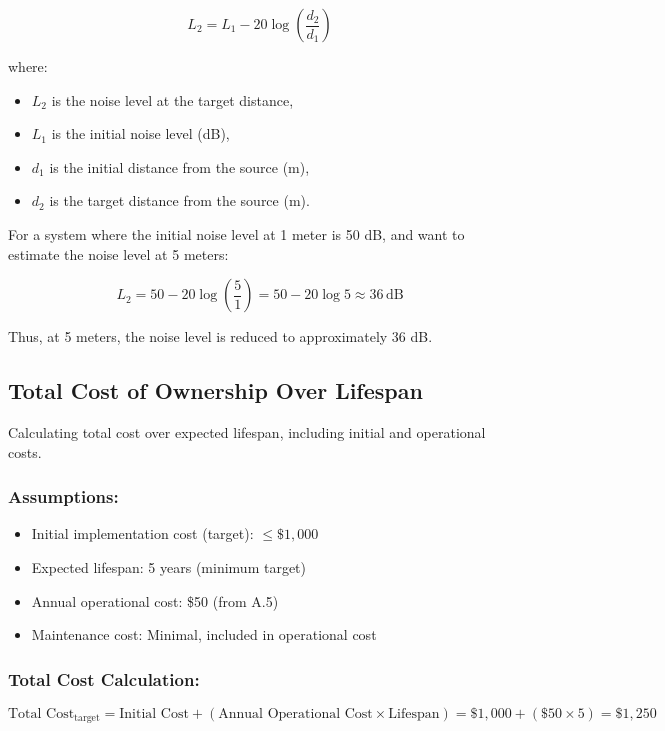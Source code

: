 \documentclass[12pt]{report}
\begin{document}
\begin{equation}
    L_2 = L_1 - 20 \log \left( \frac{d_2}{d_1} \right)
\end{equation}

where:
\begin{itemize}
    \item $L_2$ is the noise level at the target distance,
    \item $L_1$ is the initial noise level (dB),
    \item $d_1$ is the initial distance from the source (m),
    \item $d_2$ is the target distance from the source (m).
\end{itemize}

For a system where the initial noise level at 1 meter is 50 dB, and want to estimate the noise level at 5 meters:

\[
L_2 = 50 - 20 \log \left( \frac{5}{1} \right) = 50 - 20 \log 5 \approx 36 \, \text{dB}
\]

Thus, at 5 meters, the noise level is reduced to approximately 36 dB.

\subsection{Total Cost of Ownership Over Lifespan}

Calculating total cost over expected lifespan, including initial and operational costs.

\subsubsection{Assumptions:}

\begin{itemize}
    \item Initial implementation cost (target): \(\leq\$1,000\)
\item Expected lifespan: 5 years (minimum target)
\item Annual operational cost: \$50 (from A.5)
\item Maintenance cost: Minimal, included in operational cost
\end{itemize}

\subsubsection{Total Cost Calculation:}

\[
\text{Total Cost}_{\text{target}} = \text{Initial Cost} + (\text{Annual Operational Cost} \times \text{Lifespan}) = \$1,000 + (\$50 \times 5) = \$1,250
\]
\end{document}
